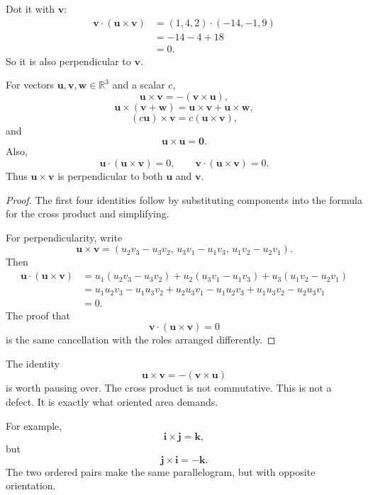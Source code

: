 Dot it with \(\mathbf v\):
\[
\begin{aligned}
    \mathbf v\cdot(\mathbf u\times\mathbf v)
    &=
    (1,4,2)\cdot(-14,-1,9)\\
    &=
    -14-4+18\\
    &=0.
\end{aligned}
\]
So it is also perpendicular to \(\mathbf v\).

\begin{theorem}
For vectors \(\mathbf u,\mathbf v,\mathbf w\in\mathbb R^3\) and a scalar \(c\),
\[
    \mathbf u\times\mathbf v=-(\mathbf v\times\mathbf u),
\]
\[
    \mathbf u\times(\mathbf v+\mathbf w)
    =
    \mathbf u\times\mathbf v+\mathbf u\times\mathbf w,
\]
\[
    (c\mathbf u)\times\mathbf v
    =
    c(\mathbf u\times\mathbf v),
\]
and
\[
    \mathbf u\times\mathbf u=\mathbf 0.
\]
Also,
\[
    \mathbf u\cdot(\mathbf u\times\mathbf v)=0,
    \qquad
    \mathbf v\cdot(\mathbf u\times\mathbf v)=0.
\]
Thus \(\mathbf u\times\mathbf v\) is perpendicular to both \(\mathbf u\) and
\(\mathbf v\).
\end{theorem}

\begin{proof}
The first four identities follow by substituting components into the formula for the
cross product and simplifying.

For perpendicularity, write
\[
\mathbf u\times\mathbf v
=
(u_2v_3-u_3v_2,\,
u_3v_1-u_1v_3,\,
u_1v_2-u_2v_1).
\]
Then
\[
\begin{aligned}
\mathbf u\cdot(\mathbf u\times\mathbf v)
&=
u_1(u_2v_3-u_3v_2)
+u_2(u_3v_1-u_1v_3)
+u_3(u_1v_2-u_2v_1)\\
&=
u_1u_2v_3-u_1u_3v_2
+u_2u_3v_1-u_1u_2v_3
+u_1u_3v_2-u_2u_3v_1\\
&=0.
\end{aligned}
\]
The proof that
\[
    \mathbf v\cdot(\mathbf u\times\mathbf v)=0
\]
is the same cancellation with the roles arranged differently.
\end{proof}

The identity
\[
    \mathbf u\times\mathbf v=-(\mathbf v\times\mathbf u)
\]
is worth pausing over.  The cross product is not commutative.  This is not a defect.
It is exactly what oriented area demands.

For example,
\[
    \mathbf i\times\mathbf j=\mathbf k,
\]
but
\[
    \mathbf j\times\mathbf i=-\mathbf k.
\]
The two ordered pairs make the same parallelogram, but with opposite orientation.

